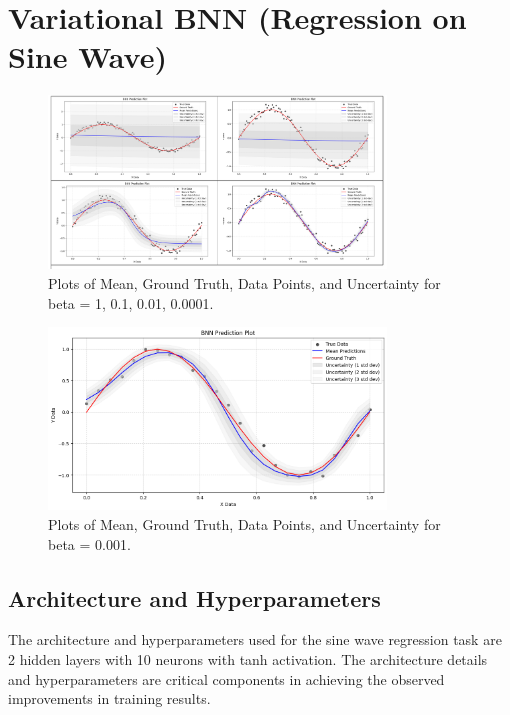 \documentclass{article}
\begin{document}
\section{Variational BNN (Regression on Sine Wave)}

\begin{figure}[h]
  \centering
  \includegraphics[width=0.8\textwidth]{pic1.png}
  \caption{Plots of Mean, Ground Truth, Data Points, and Uncertainty for beta = 1, 0.1, 0.01, 0.0001.}
  \label{fig:sine-wave-regression}
\end{figure}


\begin{figure}[h]
  \centering
  \includegraphics[width=0.8\textwidth]{reg.png}
  \caption{Plots of Mean, Ground Truth, Data Points, and Uncertainty for beta = 0.001.}
  \label{fig:sine-wave-regression}
\end{figure}

\subsection{Architecture and Hyperparameters}

The architecture and hyperparameters used for the sine wave regression task are 2 hidden layers with 10 neurons with tanh activation. The architecture details and hyperparameters are critical components in achieving the observed improvements in training results.
\end{document}

